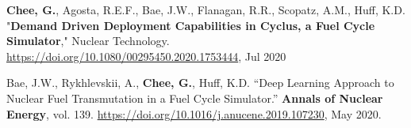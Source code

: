 \documentclass[margin,line]{resume}
\begin{document}
\begin{resume}
\begin{bibenum}
        \item \textbf{Chee, G.}, Agosta, R.E.F., Bae, J.W., Flanagan, R.R., Scopatz, A.M., 
        Huff, K.D. "\textbf{Demand Driven Deployment Capabilities in Cyclus, a Fuel Cycle Simulator}," 
        Nuclear Technology. \url{https://doi.org/10.1080/00295450.2020.1753444}, Jul 2020
        \item Bae, J.W., Rykhlevskii, A., \textbf{Chee, G.}, Huff, K.D. ``Deep 
        Learning Approach to Nuclear Fuel Transmutation in a Fuel Cycle 
        Simulator.'' \textbf{Annals of Nuclear Energy}, vol. 139. 
        \url{https://doi.org/10.1016/j.anucene.2019.107230}, May 2020.

      \end{bibenum}

\end{resume}
\end{document}
